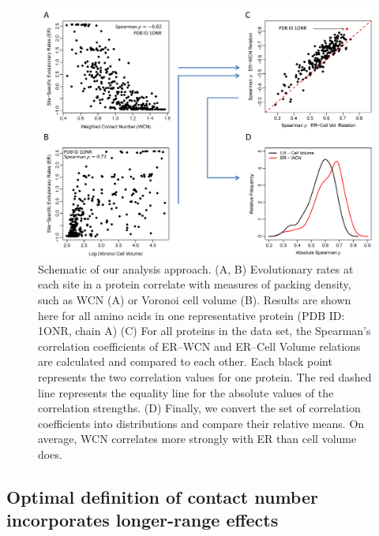 \documentclass[12pt]{article}
\begin{document}
    \begin{figure}[h]
        \begin{center}
            \includegraphics[width=6in]{pipeline.png}
        \end{center}
        \caption{Schematic of our analysis approach. (A, B) Evolutionary rates at each site in a protein correlate with measures of packing density, such as WCN (A) or Voronoi cell volume (B). Results are shown here for all amino acids in one representative protein (PDB ID: 1ONR, chain A) (C) For all proteins in the data set, the Spearman's correlation coefficients of ER--WCN and ER--Cell Volume relations are calculated and compared to each other. Each black point represents the two correlation values for one protein. The red dashed line represents the equality line for the absolute values of the correlation strengths. (D) Finally, we convert the set of correlation coefficients into distributions and compare their relative means. On average, WCN correlates more strongly with ER than cell volume does.}
        \label{fig:pipeline}
    \end{figure}

\subsection*{Optimal definition of contact number incorporates longer-range effects}
\end{document}
